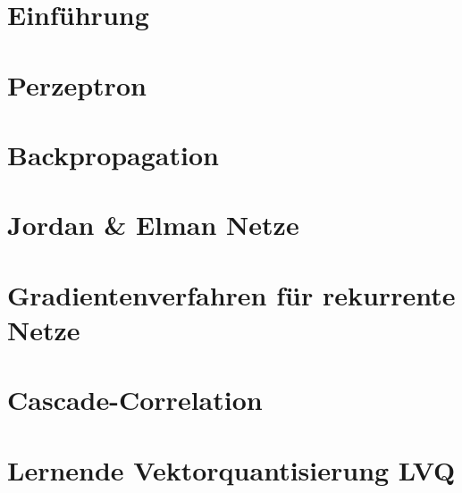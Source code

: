 \documentclass[fleqn,10pt]{SelfArx} %
\begin{document}


\section{Einführung} 


\section{Perzeptron}


\section{Backpropagation}


\section{Jordan \& Elman Netze}


\section{Gradientenverfahren für rekurrente Netze}


\section{Cascade-Correlation}


\section{Lernende Vektorquantisierung LVQ}

\end{document}
